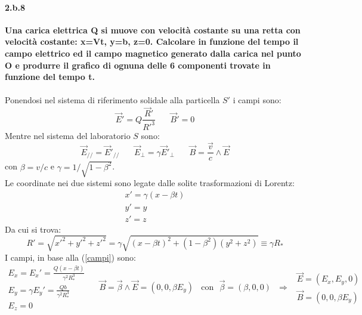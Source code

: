 \documentclass[twoside]{article}
\newcommand {\paral} {\mathrel{/\!/}}
\begin{document}
\paragraph{2.b.8}\textbf{Una carica elettrica Q si muove con velocità costante su una retta con velocità
costante: x=Vt, y=b, z=0. Calcolare in funzione del tempo il campo elettrico ed il
campo magnetico generato dalla carica nel punto O e produrre il grafico di
ognuna delle 6 componenti trovate in funzione del tempo t.}\\ \\

Ponendosi nel sistema di riferimento solidale alla particella $S'$ i campi sono:
\begin{equation}
    \vec{E}'=Q\frac{\vec{R}'}{R'^3} \ \ \ \ \ \ \ \ \vec{B}'=0
\end{equation}
Mentre nel sistema del laboratorio $S$ sono:
\begin{equation}\label{campi}
    \vec{E}_{\paral}=\vec{E}'_{\paral} \ \ \ \ \ \ \ \  \vec{E}_{\perp}=\gamma \vec{E}'_{\perp} \ \ \ \ \ \ \ \ \vec{B}=\frac{\vec{v}}{c}\wedge\vec{E}
\end{equation}
con $\beta=v/c$ e $\gamma=1/\sqrt{1-\beta^2}$. \\
Le coordinate nei due sistemi sono legate dalle solite trasformazioni di Lorentz:
\begin{equation}
    \begin{array}{lr}
         x'=\gamma(x-\beta t)  \\
         y'=y \\
         z'=z
    \end{array}
\end{equation}
Da cui si trova:
\begin{equation}
    R'=\sqrt{x'^2+y'^2+z'^2}=\gamma\sqrt{(x-\beta t)^2+(1-\beta ^2)(y^2+z^2)}\equiv \gamma R_{*}
\end{equation}
I campi, in base alla (\ref{campi})
sono:
\begin{equation}
    \begin{array}{lr}
         E_x=E_x '=\frac{Q(x-\beta t)}{\gamma^2 R_* ^3}  \\
         E_y=\gamma E_y '=\frac{Qb}{\gamma^2 R_* ^3} \\
         E_z=0
    \end{array} \ \ \ \ \ \ \vec{B}=\vec{\beta}\wedge \vec{E}=(0,0,\beta E_y) \ \ \ \ \text{con} \ \ \ \vec{\beta}=(\beta,0,0) \ \ \ \Rightarrow \ \ \begin{array}{lr}
         \vec{E}=(E_x,E_y,0) \\
         \vec{B}=(0,0,\beta E_y)
    \end{array}
\end{equation}
\end{document}
